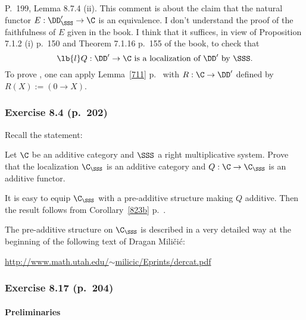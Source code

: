 \documentclass[12pt]{article}
\theoremstyle{remark}
\theoremstyle{definition}
\begin{document}



P.~199, Lemma 8.7.4 (ii). This comment is about the claim that the natural functor $E:\DD'_\SSS\to\C$ is an equivalence. I don't understand the proof of the faithfulness of $E$ given in the book. I think that it suffices, in view of Proposition 7.1.2 (i) p.~150 and Theorem 7.1.16 p.~155 of the book, to check that
%
\begin{equation}\lb{l}
Q:\DD'\to\C\text{ is a localization of }\DD'\text{ by }\SSS.
\end{equation}
%
To prove , one can apply Lemma~\ref{711} p.~ with $R:\C\to\DD'$ defined by $R(X):=(0\to X)$. 



\subsubsection{Exercise 8.4 (p.~202)}

Recall the statement: 

Let $\C$ be an additive category and $\SSS$ a right multiplicative system. Prove that the localization $\C_\SSS$ is an additive category and $Q:\C\to\C_\SSS$ is an additive functor. 

It is easy to equip $\C_\SSS$ with a pre-additive structure making $Q$ additive. Then the result follows from Corollary~\ref{823b} p.~. 

The pre-additive structure on $\C_\SSS$ is described in a very detailed way at the beginning of the following text of Dragan Mili\v{c}i\'c:  
%
\begin{center}\href{http://www.math.utah.edu/~milicic/Eprints/dercat.pdf}{http://www.math.utah.edu/$\sim$milicic/Eprints/dercat.pdf}
\end{center} 


\subsubsection{Exercise 8.17 (p.~204)} 

\paragraph{Preliminaries} 
\end{document}
